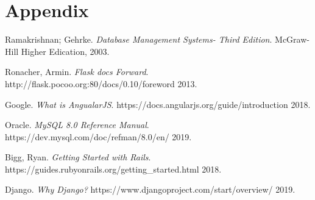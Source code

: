 \documentclass{article}
\begin{document}
  \section{Appendix}\label{sec:Appendix}

  \medskip


  \begin{thebibliography}{4}

    Ramakrishnan; Gehrke.
    \textit{Database Management Systems- Third Edition}.
    McGraw-Hill Higher Edication, 2003.

    Ronacher, Armin.
    \textit{Flask docs Forward}.
    http://flask.pocoo.org:80/docs/0.10/foreword
    2013.

    Google.
    \textit{What is AngualarJS}.
    https://docs.angularjs.org/guide/introduction
    2018.

    Oracle.
    \textit{MySQL 8.0 Reference Manual}.
    https://dev.mysql.com/doc/refman/8.0/en/
    2019.

    Bigg, Ryan.
    \textit{Getting Started with Rails}.
    https://guides.rubyonrails.org/getting\_started.html
    2018.

    Django.
    \textit{Why Django?}
    https://www.djangoproject.com/start/overview/
    2019.

  \end{thebibliography}
\end{document}
